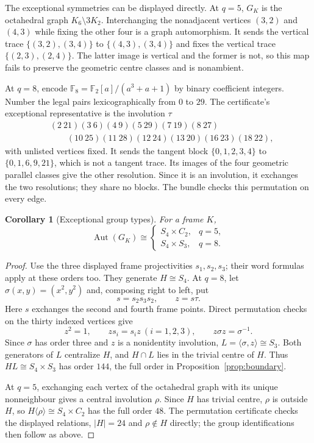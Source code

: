 \documentclass[11pt]{article}
\newtheorem{corollary}[theorem]{Corollary}
\theoremstyle{definition}
\theoremstyle{remark}
\newcommand{\F}{\mathbb F}
\newcommand{\Aut}{\operatorname{Aut}}
\begin{document}
The exceptional symmetries can be displayed directly. At $q=5$,
$G_K$ is the octahedral graph $K_6\setminus3K_2$. Interchanging the
nonadjacent vertices $(3,2)$ and $(4,3)$ while fixing the other four
is a graph automorphism. It sends the vertical trace
$\{(3,2),(3,4)\}$ to $\{(4,3),(3,4)\}$ and fixes the vertical trace
$\{(2,3),(2,4)\}$. The latter image is vertical and the former is not,
so this map fails to preserve the geometric centre classes and is nonambient.

At $q=8$, encode $\F_8=\F_2[a]/(a^3+a+1)$ by binary coefficient
integers. Number the legal pairs lexicographically from $0$ to $29$.
The certificate's exceptional representative is the involution $\tau$
\[
\begin{split}
 &(2\ 21)(3\ 6)(4\ 9)(5\ 29)(7\ 19)(8\ 27)\\
 &\qquad(10\ 25)(11\ 28)(12\ 24)(13\ 20)(16\ 23)(18\ 22),
\end{split}
\]
with unlisted vertices fixed. It sends the tangent block
$\{0,1,2,3,4\}$ to $\{0,1,6,9,21\}$, which is not a tangent trace.
Its images of the four geometric parallel classes give the other
resolution. Since it is an involution, it exchanges the two resolutions;
they share no blocks. The bundle checks this permutation on every edge.

\begin{corollary}[Exceptional group types]\label{cor:exceptional-groups}
For a frame $K$,
\[
 \Aut(G_K)\cong
 \begin{cases}
 S_4\times C_2,&q=5,\\
 S_4\times S_3,&q=8.
 \end{cases}
\]
\end{corollary}
\begin{proof}
Use the three displayed frame projectivities $s_1,s_2,s_3$; their word
formulas apply at these orders too. They generate $H\cong S_4$.
At $q=8$, let $\sigma(x,y)=(x^2,y^2)$ and, composing right to left, put
\[
 s=s_2s_3s_2,\qquad z=s\tau.
\]
Here $s$ exchanges the second and fourth frame points. Direct permutation
checks on the thirty indexed vertices give
\[
 z^2=1,\qquad zs_i=s_i z\ (i=1,2,3),\qquad
 z\sigma z=\sigma^{-1}.
\]
Since $\sigma$ has order three and $z$ is a nonidentity involution,
$L=\langle\sigma,z\rangle\cong S_3$. Both generators of $L$ centralize
$H$, and $H\cap L$ lies in the trivial centre of $H$. Thus
$HL\cong S_4\times S_3$ has order $144$, the full order in
Proposition~\ref{prop:boundary}.

At $q=5$, exchanging each vertex of the octahedral graph with its unique
nonneighbour gives a central involution $\rho$. Since $H$ has trivial
centre, $\rho$ is outside $H$,
so $H\langle\rho\rangle\cong S_4\times C_2$ has the full order $48$.
The permutation certificate checks the displayed relations, $|H|=24$
and $\rho\notin H$ directly; the group identifications then follow as above.
\end{proof}
\end{document}
